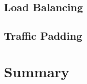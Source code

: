 \blindtext

\subsection{Load Balancing}

\blindtext

\subsection{Traffic Padding}

\blindtext









\section{Summary}

\blindtext
